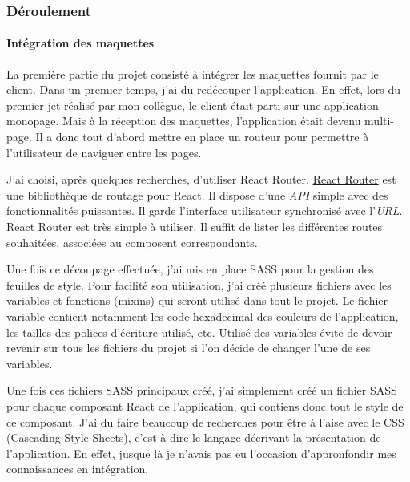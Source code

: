 \bigskip

\subsubsection{Déroulement}\label{duxe9roulement}

\bigskip

\paragraph{Intégration des
maquettes}\label{intuxe9gration-des-maquettes}

\bigskip

La première partie du projet consisté à intégrer les maquettes fournit
par le client. Dans un premier temps, j'ai du redécouper l'application.
En effet, lors du premier jet réalisé par mon collègue, le client était
parti sur une application monopage. Mais à la réception des maquettes,
l'application était devenu multi-page. Il a donc tout d'abord mettre en
place un routeur pour permettre à l'utilisateur de naviguer entre les
pages.

\bigskip

J'ai choisi, après quelques recherches, d'utiliser React Router.
\href{https://github.com/ReactTraining/react-router}{React Router} est
une bibliothèque de routage pour React. Il dispose d'une \emph{API}
simple avec des fonctionnalités puissantes. Il garde l'interface
utilisateur synchronisé avec l'\emph{URL}. React Router est très simple
à utiliser. Il suffit de lister les différentes routes souhaitées,
associées au composent correspondants.

\bigskip

Une fois ce découpage effectuée, j'ai mis en place SASS pour la gestion
des feuilles de style. Pour facilité son utilisation, j'ai créé
plusieurs fichiers avec les variables et fonctions (mixins) qui seront
utilisé dans tout le projet. Le fichier variable contient notamment les
code hexadecimal des couleurs de l'application, les tailles des polices
d'écriture utilisé, etc. Utilisé des variables évite de devoir revenir
sur tous les fichiers du projet si l'on décide de changer l'une de ses
variables.

\bigskip

Une fois ces fichiers SASS principaux créé, j'ai simplement créé un
fichier SASS pour chaque composant React de l'application, qui contiens
donc tout le style de ce composant. J'ai du faire beaucoup de recherches
pour être à l'aise avec le CSS (Cascading Style Sheets), c'est à dire le
langage décrivant la présentation de l'application. En effet, jusque là
je n'avais pas eu l'occasion d'appronfondir mes connaissances en
intégration.

